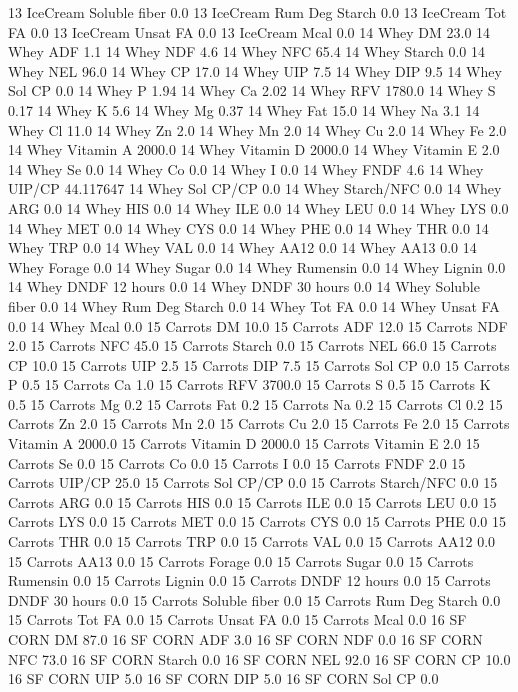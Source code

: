 \documentclass[letterpaper,10pt,english]{sphinxmanual}
\begin{document}
\begin{sphinxVerbatim}[commandchars=\\\{\},numbers=left,firstnumber=1,stepnumber=1]
13 IceCream Soluble fiber 0.0
13 IceCream Rum Deg Starch 0.0
13 IceCream Tot FA 0.0
13 IceCream Unsat FA 0.0
13 IceCream Mcal 0.0
14 Whey DM 23.0
14 Whey ADF 1.1
14 Whey NDF 4.6
14 Whey NFC 65.4
14 Whey Starch 0.0
14 Whey NEL 96.0
14 Whey CP 17.0
14 Whey UIP 7.5
14 Whey DIP 9.5
14 Whey Sol CP 0.0
14 Whey P 1.94
14 Whey Ca 2.02
14 Whey RFV 1780.0
14 Whey S 0.17
14 Whey K 5.6
14 Whey Mg 0.37
14 Whey Fat 15.0
14 Whey Na 3.1
14 Whey Cl 11.0
14 Whey Zn 2.0
14 Whey Mn 2.0
14 Whey Cu 2.0
14 Whey Fe 2.0
14 Whey Vitamin A 2000.0
14 Whey Vitamin D 2000.0
14 Whey Vitamin E 2.0
14 Whey Se 0.0
14 Whey Co 0.0
14 Whey I 0.0
14 Whey FNDF 4.6
14 Whey UIP/CP 44.117647
14 Whey Sol CP/CP 0.0
14 Whey Starch/NFC 0.0
14 Whey ARG 0.0
14 Whey HIS 0.0
14 Whey ILE 0.0
14 Whey LEU 0.0
14 Whey LYS 0.0
14 Whey MET 0.0
14 Whey CYS 0.0
14 Whey PHE 0.0
14 Whey THR 0.0
14 Whey TRP 0.0
14 Whey VAL 0.0
14 Whey AA\PYGZsh{}12 0.0
14 Whey AA\PYGZsh{}13 0.0
14 Whey \PYGZpc{} Forage 0.0
14 Whey Sugar \PYGZpc{} 0.0
14 Whey Rumensin 0.0
14 Whey Lignin 0.0
14 Whey DNDF 12 hours 0.0
14 Whey DNDF 30 hours 0.0
14 Whey Soluble fiber 0.0
14 Whey Rum Deg Starch 0.0
14 Whey Tot FA 0.0
14 Whey Unsat FA 0.0
14 Whey Mcal 0.0
15 Carrots DM 10.0
15 Carrots ADF 12.0
15 Carrots NDF 2.0
15 Carrots NFC 45.0
15 Carrots Starch 0.0
15 Carrots NEL 66.0
15 Carrots CP 10.0
15 Carrots UIP 2.5
15 Carrots DIP 7.5
15 Carrots Sol CP 0.0
15 Carrots P 0.5
15 Carrots Ca 1.0
15 Carrots RFV 3700.0
15 Carrots S 0.5
15 Carrots K 0.5
15 Carrots Mg 0.2
15 Carrots Fat 0.2
15 Carrots Na 0.2
15 Carrots Cl 0.2
15 Carrots Zn 2.0
15 Carrots Mn 2.0
15 Carrots Cu 2.0
15 Carrots Fe 2.0
15 Carrots Vitamin A 2000.0
15 Carrots Vitamin D 2000.0
15 Carrots Vitamin E 2.0
15 Carrots Se 0.0
15 Carrots Co 0.0
15 Carrots I 0.0
15 Carrots FNDF 2.0
15 Carrots UIP/CP 25.0
15 Carrots Sol CP/CP 0.0
15 Carrots Starch/NFC 0.0
15 Carrots ARG 0.0
15 Carrots HIS 0.0
15 Carrots ILE 0.0
15 Carrots LEU 0.0
15 Carrots LYS 0.0
15 Carrots MET 0.0
15 Carrots CYS 0.0
15 Carrots PHE 0.0
15 Carrots THR 0.0
15 Carrots TRP 0.0
15 Carrots VAL 0.0
15 Carrots AA\PYGZsh{}12 0.0
15 Carrots AA\PYGZsh{}13 0.0
15 Carrots \PYGZpc{} Forage 0.0
15 Carrots Sugar \PYGZpc{} 0.0
15 Carrots Rumensin 0.0
15 Carrots Lignin 0.0
15 Carrots DNDF 12 hours 0.0
15 Carrots DNDF 30 hours 0.0
15 Carrots Soluble fiber 0.0
15 Carrots Rum Deg Starch 0.0
15 Carrots Tot FA 0.0
15 Carrots Unsat FA 0.0
15 Carrots Mcal 0.0
16 SF CORN DM 87.0
16 SF CORN ADF 3.0
16 SF CORN NDF 0.0
16 SF CORN NFC 73.0
16 SF CORN Starch 0.0
16 SF CORN NEL 92.0
16 SF CORN CP 10.0
16 SF CORN UIP 5.0
16 SF CORN DIP 5.0
16 SF CORN Sol CP 0.0

\end{sphinxVerbatim}
\end{document}
